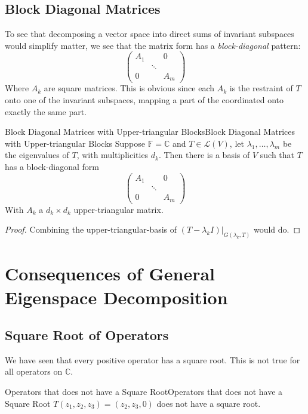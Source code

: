 \documentclass[../main.tex]{subfiles}
\begin{document}
\subsection{Block Diagonal Matrices}

To see that decomposing a vector space into direct sums of invariant subspaces would simplify matter, we see that the matrix form has a \emph{block-diagonal} pattern:
\begin{equation*}
\begin{pmatrix}
	A_1&&0\\
	   &\ddots &\\
	0&&A_m
\end{pmatrix}
\end{equation*}
Where $A_k$ are square matrices. This is obvious since each $A_k$ is the restraint of $T$ onto one of the invariant subspaces, mapping a part of the coordinated onto exactly the same part.

\begin{theorem}{Block Diagonal Matrices with Upper-triangular Blocks}{Block Diagonal Matrices with Upper-triangular Blocks}
Suppose $\mathbb{F}=\mathbb{C}$ and $T\in \mathscr{L}(V)$, let $\lambda_1, \ldots ,\lambda_m$ be the eigenvalues of $T$, with multiplicities $d_k$. Then there is a basis of $V$ such that $T$ has a block-diagonal form
\begin{equation*}
\begin{pmatrix}
	A_1&&0\\
	   &\ddots &\\
	0&&A_m
\end{pmatrix}
\end{equation*}
With $A_k$ a $d_k \times d_k$ upper-triangular matrix.
\end{theorem}
\begin{proof}
Combining the upper-triangular-basis of $(T-\lambda_kI)|_{G(\lambda_k,T)}$ would do.
\end{proof}

\section{Consequences of General Eigenspace Decomposition}
\subsection{Square Root of Operators}
We have seen that every positive operator has a square root. This is not true for all operators on $\mathbb{C}$.
\begin{example}{Operators that does not have a Square Root}{Operators that does not have a Square Root}
$T(z_1,z_2,z_3) = (z_2,z_3,0)$ does not have a square root.
\end{example}
\end{document}
